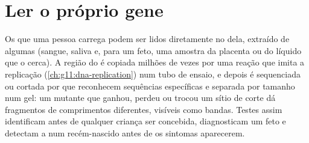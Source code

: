 \section{Ler o próprio gene}

\begin{proposition}\label{prop:g11:genes-and-disease:testing}
Os  que uma pessoa carrega podem ser lidos diretamente no 
dela, extraído de algumas  (sangue, saliva e, para um feto, uma
amostra da placenta ou do líquido que o cerca). A região do  é
copiada milhões de vezes por uma reação que imita a replicação
(\cref{ch:g11:dna-replication}) num tubo de ensaio, e depois é
sequenciada ou cortada por  que reconhecem sequências
específicas e separada por tamanho num gel: um  mutante que ganhou,
perdeu ou trocou um sítio de corte dá fragmentos de comprimentos
diferentes, visíveis como bandas. Testes assim identificam 
antes de qualquer criança ser concebida, diagnosticam um feto e
detectam a  num recém-nascido antes de os sintomas aparecerem.
\end{proposition}
\admitted

